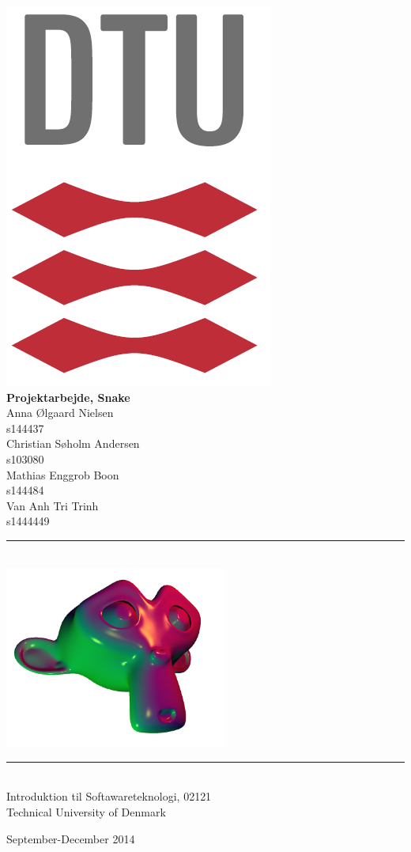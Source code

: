 \begin{center}

\vspace*{-30mm} \noindent
\hfill \includegraphics[height=15 mm]{pics/DTULogo.png} \\[30mm]

{\Huge \bf Projektarbejde, Snake %
}\\[15mm]

{\Large Anna Ølgaard Nielsen} \\  s144437 \\[5mm]
{\Large Christian Søholm Andersen} \\  s103080 \\[5mm]
{\Large Mathias Enggrob Boon} \\  s144484 \\[5mm]
{\Large Van Anh Tri Trinh } \\  s1444449 \\[12mm]

\rule{\textwidth}{0.5pt}\\[4mm]                   
\mbox{\includegraphics[height=60mm]{pics/FrontFig.png}}\\    
\rule{\textwidth}{0.5pt}\\[12mm]                         

Introduktion til Softawareteknologi,  02121\\              
Technical University of Denmark\\[4mm]                    
\centerline{\large September-December 2014}                         

\end{center}
\thispagestyle{empty}
\newpage
